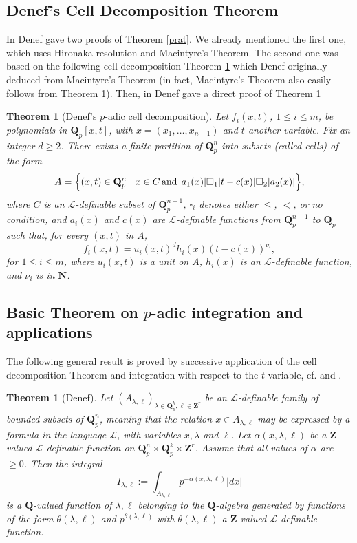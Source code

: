 \documentclass[english,12pt]{amsart}
\def\NN{{\mathbf N}}
\def\QQ{{\mathbf Q}}
\def\ZZ{{\mathbf Z}}
\def\cL{{\mathcal L}}
\newtheorem{theorem}[subsubsection]{Theorem}
\theoremstyle{definition}
\theoremstyle{remark}
\theoremstyle{plain}
\numberwithin{equation}{subsection}
\def\NN{{\mathbf N}}
\def\QQ{{\mathbf Q}}
\def\ZZ{{\mathbf Z}}
\def\cL{{\mathcal L}}
\begin{document}
\subsection{Denef's Cell Decomposition Theorem}


In \cite{denef} Denef gave two proofs of Theorem \ref{prat}. We already
mentioned
the first one, which uses
Hironaka resolution and Macintyre's Theorem. The second one 
was based on the following cell decomposition Theorem \ref{cdt}
which Denef originally deduced
from  Macintyre's Theorem (in fact, Macintyre's Theorem also
easily follows from Theorem \ref{cdt}). 
Then, in \cite{Dcell} Denef gave a direct 
proof of Theorem \ref{cdt}



\begin{theorem}[Denef's $p$-adic cell decomposition]\label{cdt}
Let $f_i (x, t)$, $1 \leq i \leq m$, be polynomials in $\QQ_p [x, t]$,
with $x = (x_1, \dots, x_{n - 1})$ and $t$ another variable.
Fix an integer $d \geq 2$. There exists a finite partition of
$\QQ_p^n$ into subsets (called cells) of the form
$$
A =  
\Bigl\{
(x, t) \in \QQ_p^n \Bigm \vert x \in C \, \text{and} \, 
\vert a_1 (x) \vert
\square_1 \vert t - c (x) \vert \square_2 \vert a_2 (x) \vert
\Bigr\},
$$
where $C$ is an $\cL$-definable subset of $\QQ_p^{n - 1}$, $ \square_i$
denotes either $\leq$, $<$, or no condition, and
$a_i (x)$ and $c (x)$ are $\cL$-definable functions from
$\QQ_p^{n - 1}$ to $\QQ_p$
such that, for every $(x, t)$ in $A$,
$$
f_i (x, t) = u_i (x, t)^d h_i (x) (t - c (x))^{\nu_i},
$$
for $1 \leq i \leq m$, where $u_i  (x, t)$ is a unit on $A$, $h_i (x)$ 
is an $\cL$-definable function, and $\nu_i$ is in $\NN$.
\end{theorem}


\subsection{Basic Theorem on $p$-adic
integration and applications}


The following general result is proved by successive
application of the cell decomposition Theorem and integration with respect to the $t$-variable,
cf. \cite{D85} and \cite{D2000}.


\begin{theorem}[Denef]\label{btp}Let
$(A_{\lambda, \ell})_{\lambda \in \QQ_p^k, \ell \in \ZZ^r}$
be an $\cL$-definable family of bounded subsets of $\QQ_p^n$,
meaning that the relation $x \in A_{\lambda, \ell}$ may be expressed by a formula 
in the language $\cL$, with variables $x, \lambda$ and $\ell$.
Let $\alpha (x, \lambda, \ell)$  be a $\ZZ$-valued $\cL$-definable function
on $\QQ_p^n \times \QQ_p^k \times \ZZ^r$.
Assume that all values of $\alpha$ are $\geq 0$.
Then the integral
$$
I_{\lambda, \ell} :=  \int_{A_{\lambda, \ell}} p^{- \alpha (x, \lambda, \ell)} \vert dx \vert
$$
is a $\QQ$-valued function of $\lambda, \ell$
belonging to the $\QQ$-algebra generated by functions of
the form $\theta (\lambda, \ell)$ and
$p^{\theta (\lambda, \ell)}$ with $\theta (\lambda, \ell)$ a $\ZZ$-valued
$\cL$-definable function.
\end{theorem}
\end{document}
